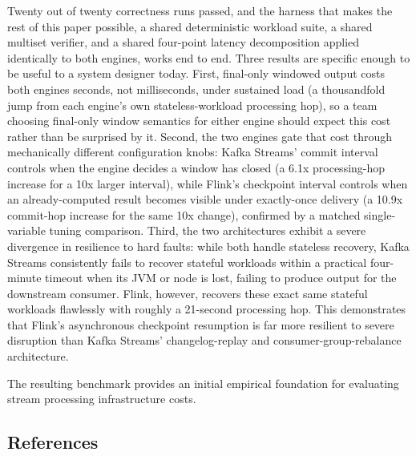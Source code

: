 \documentclass[
]{article}
\begin{document}
Twenty out of twenty correctness runs passed, and the harness that makes
the rest of this paper possible, a shared deterministic workload suite,
a shared multiset verifier, and a shared four-point latency
decomposition applied identically to both engines, works end to end.
Three results are specific enough to be useful to a system designer
today. First, final-only windowed output costs both engines seconds, not
milliseconds, under sustained load (a thousandfold jump from each
engine's own stateless-workload processing hop), so a team choosing
final-only window semantics for either engine should expect this cost
rather than be surprised by it. Second, the two engines gate that cost
through mechanically different configuration knobs: Kafka Streams'
commit interval controls when the engine decides a window has closed (a
6.1x processing-hop increase for a 10x larger interval), while Flink's
checkpoint interval controls when an already-computed result becomes
visible under exactly-once delivery (a 10.9x commit-hop increase for the
same 10x change), confirmed by a matched single-variable tuning
comparison. Third, the two architectures exhibit a severe divergence in
resilience to hard faults: while both handle stateless recovery, Kafka
Streams consistently fails to recover stateful workloads within a
practical four-minute timeout when its JVM or node is lost, failing to
produce output for the downstream consumer. Flink, however, recovers
these exact same stateful workloads flawlessly with roughly a 21-second
processing hop. This demonstrates that Flink's asynchronous checkpoint
resumption is far more resilient to severe disruption than Kafka
Streams' changelog-replay and consumer-group-rebalance architecture.

The resulting benchmark provides an initial empirical foundation for
evaluating stream processing infrastructure costs.

\hypertarget{references}{%
\subsection{References}\label{references}}
\end{document}
